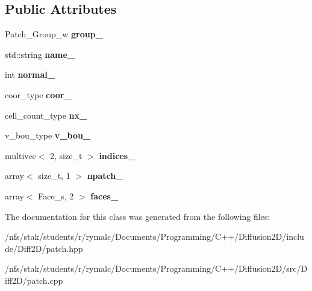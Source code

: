 \subsection*{Public Attributes}
\begin{DoxyCompactItemize}
\item 
\hypertarget{classPatch_a93fff2891647c4109c16cb4ec2079545}{
Patch\_\-Group\_\-w {\bfseries group\_\-}}
\label{classPatch_a93fff2891647c4109c16cb4ec2079545}

\item 
\hypertarget{classPatch_a133d268d88897aef8b20ca7da98b9cdb}{
std::string {\bfseries name\_\-}}
\label{classPatch_a133d268d88897aef8b20ca7da98b9cdb}

\item 
\hypertarget{classPatch_a01951c7c7aec32d184e11869ab23877d}{
int {\bfseries normal\_\-}}
\label{classPatch_a01951c7c7aec32d184e11869ab23877d}

\item 
\hypertarget{classPatch_a3beca2ce16697d8e8097ba92ee6bdc29}{
coor\_\-type {\bfseries coor\_\-}}
\label{classPatch_a3beca2ce16697d8e8097ba92ee6bdc29}

\item 
\hypertarget{classPatch_aa69a7e422610ce91ad4fb60c88cadbf0}{
cell\_\-count\_\-type {\bfseries nx\_\-}}
\label{classPatch_aa69a7e422610ce91ad4fb60c88cadbf0}

\item 
\hypertarget{classPatch_a10f2316309ff37fb1238153527eeab48}{
v\_\-bou\_\-type {\bfseries v\_\-bou\_\-}}
\label{classPatch_a10f2316309ff37fb1238153527eeab48}

\item 
\hypertarget{classPatch_af272c0110d640ddd191492fc9cc62990}{
multivec$<$ 2, size\_\-t $>$ {\bfseries indices\_\-}}
\label{classPatch_af272c0110d640ddd191492fc9cc62990}

\item 
\hypertarget{classPatch_aaa96294c5c204449ca53209b040ae06c}{
array$<$ size\_\-t, 1 $>$ {\bfseries npatch\_\-}}
\label{classPatch_aaa96294c5c204449ca53209b040ae06c}

\item 
\hypertarget{classPatch_a6d0bbabb9b7b1928bda12255b312fedd}{
array$<$ Face\_\-s, 2 $>$ {\bfseries faces\_\-}}
\label{classPatch_a6d0bbabb9b7b1928bda12255b312fedd}

\end{DoxyCompactItemize}


The documentation for this class was generated from the following files:\begin{DoxyCompactItemize}
\item 
/nfs/stak/students/r/rymalc/Documents/Programming/C++/Diffusion2D/include/Diff2D/patch.hpp\item 
/nfs/stak/students/r/rymalc/Documents/Programming/C++/Diffusion2D/src/Diff2D/patch.cpp\end{DoxyCompactItemize}
